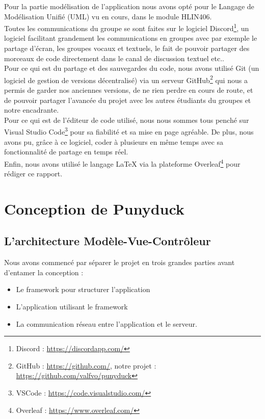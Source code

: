 \documentclass[twoside]{report}
\begin{document}
Pour la partie modélisation de l'application nous avons opté pour le Langage de Modélisation Unifié (UML) vu en cours, dans le module HLIN406. \\

Toutes les communications du groupe se sont faites sur le logiciel Discord\footnote{Discord : \url{https://discordapp.com/}}, un logiciel facilitant grandement les communications en groupes avec par exemple le partage d'écran, les groupes vocaux et textuels, le fait de pouvoir partager des morceaux de code directement dans le canal de discussion textuel etc.. \\

Pour ce qui est du partage et des sauvegardes du code, nous avons utilisé Git (un logiciel de gestion de versions décentralisé) via un serveur GitHub\footnote{GitHub : \url{https://github.com/}, notre projet : \url{https://github.com/valfvo/punyduck}} qui nous a permis de garder nos anciennes versions, de ne rien perdre en cours de route, et de pouvoir partager l'avancée du projet avec les autres étudiants du groupes et notre encadrante. \\

Pour ce qui est de l'éditeur de code utilisé, nous nous sommes tous penché sur Visual Studio Code\footnote{VSCode : \url{https://code.visualstudio.com/}} pour sa fiabilité et sa mise en page agréable. De plus, nous avons pu, grâce à ce logiciel, coder à plusieurs en même temps avec sa fonctionnalité de partage en temps réel. \\

Enfin, nous avons utilisé le langage \LaTeX{} via la plateforme Overleaf\footnote{Overleaf : \url{https://www.overleaf.com/}} pour rédiger ce rapport.

\chapter{Conception de Punyduck}
\label{conception}
\section{L'architecture Modèle-Vue-Contrôleur}

Nous avons commencé par séparer le projet en trois grandes parties avant d'entamer la conception :
\begin{itemize}[label=$-$, leftmargin=1.5cm]
    \setlength\itemsep{0em}
    \item Le framework pour structurer l'application
    \item L'application utilisant le framework
    \item La communication réseau entre l'application et le serveur.
\end{itemize}
\end{document}
